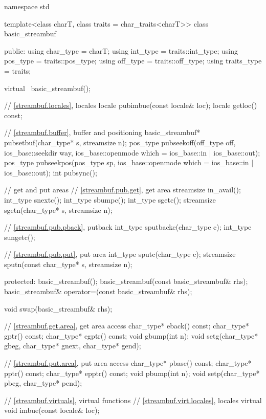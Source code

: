 %
\begin{codeblock}
namespace std {
  template<class charT, class traits = char_traits<charT>>
  class basic_streambuf {
  public:
    using char_type   = charT;
    using int_type    = traits::int_type;
    using pos_type    = traits::pos_type;
    using off_type    = traits::off_type;
    using traits_type = traits;

    virtual ~basic_streambuf();

    // \ref{streambuf.locales}, locales
    locale   pubimbue(const locale& loc);
    locale   getloc() const;

    // \ref{streambuf.buffer}, buffer and positioning
    basic_streambuf* pubsetbuf(char_type* s, streamsize n);
    pos_type pubseekoff(off_type off, ios_base::seekdir way,
                        ios_base::openmode which
                          = ios_base::in | ios_base::out);
    pos_type pubseekpos(pos_type sp,
                        ios_base::openmode which
                          = ios_base::in | ios_base::out);
    int      pubsync();

    // get and put areas
    // \ref{streambuf.pub.get}, get area
    streamsize in_avail();
    int_type snextc();
    int_type sbumpc();
    int_type sgetc();
    streamsize sgetn(char_type* s, streamsize n);

    // \ref{streambuf.pub.pback}, putback
    int_type sputbackc(char_type c);
    int_type sungetc();

    // \ref{streambuf.pub.put}, put area
    int_type   sputc(char_type c);
    streamsize sputn(const char_type* s, streamsize n);

  protected:
    basic_streambuf();
    basic_streambuf(const basic_streambuf& rhs);
    basic_streambuf& operator=(const basic_streambuf& rhs);

    void swap(basic_streambuf& rhs);

    // \ref{streambuf.get.area}, get area access
    char_type* eback() const;
    char_type* gptr()  const;
    char_type* egptr() const;
    void       gbump(int n);
    void       setg(char_type* gbeg, char_type* gnext, char_type* gend);

    // \ref{streambuf.put.area}, put area access
    char_type* pbase() const;
    char_type* pptr() const;
    char_type* epptr() const;
    void       pbump(int n);
    void       setp(char_type* pbeg, char_type* pend);

    // \ref{streambuf.virtuals}, virtual functions
    // \ref{streambuf.virt.locales}, locales
    virtual void imbue(const locale& loc);

}}
\end{codeblock}
